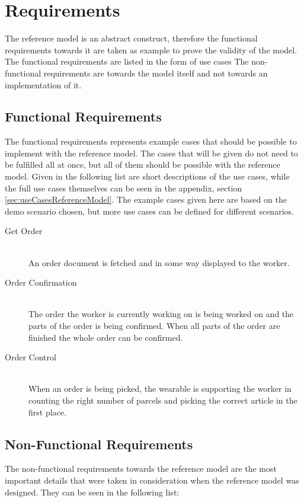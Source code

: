 \section{Requirements}
The reference model is an abstract construct, therefore the functional requirements towards it are taken as example to prove the validity of the model. The functional requirements are listed in the form of use cases The non-functional requirements are towards the model itself and not towards an implementation of it. 

\subsection{Functional Requirements}
The functional requirements represents example cases that should be possible to implement with the reference model. The cases that will be given do not need to be fulfilled all at once, but all of them should be possible with the reference model. Given in the following list are short descriptions of the use cases, while the full use cases themselves can be seen in the appendix, section \ref{sec:useCasesReferenceModel}. The example cases given here are based on the demo scenario chosen, but more use cases can be defined for different scenarios.

\begin{description}
	\item[Get Order] \hfill \\
		An order document is fetched and in some way displayed to the worker.
	\item[Order Confirmation] \hfill \\
		The order the worker is currently working on is being worked on and the parts of the order is being confirmed. When all parts of the order are finished the whole order can be confirmed.
	\item[Order Control] \hfill \\	
		When an order is being picked, the wearable is supporting the worker in counting the right number of parcels and picking the correct article in the first place.
\end{description}


\subsection{Non-Functional Requirements}
The non-functional requirements towards the reference model are the most important details that were taken in consideration when the reference model was designed. They can be seen in the following list:

